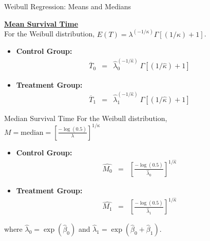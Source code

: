 \documentclass[envcountsect, 10pt, portrait, palatino]{beamer}
\begin{document}
\begin{frame}{Weibull Regression: Means and Medians}

\underline{\bf Mean Survival Time}\\[1ex]
For the Weibull distribution, $E(T)=\lambda^{(-1/\kappa)}
\Gamma[(1/\kappa) + 1]$.
\begin{itemize}
\item {\bf Control Group:}
\begin{eqnarray*}
\overline{T}_0 & = & \hat\lambda_0^{(-1/\hat\kappa)}~\Gamma[(1/\hat\kappa) + 1]
\end{eqnarray*}

\item {\bf Treatment Group:}
\begin{eqnarray*}
\overline{T}_1 & = & \hat\lambda_1^{(-1/\hat\kappa)}~\Gamma[(1/\hat\kappa) + 1]
\end{eqnarray*}
\end{itemize}

\end{frame} 
\begin{frame}{Median Survival Time}
For the Weibull distribution,
 $M = \mbox{median} = \left[\frac{-\log(0.5)}{\lambda}\right]^{1/\kappa}$
\begin{itemize}
\item {\bf Control Group:}
\begin{eqnarray*}
\hat{M_0} & = & \left[\frac{-\log(0.5)}{\hat\lambda_0}\right]^{1/\hat\kappa}
\end{eqnarray*}

\item {\bf Treatment Group:}
\begin{eqnarray*}
\hat{M_1} & = & \left[\frac{-\log(0.5)}{\hat\lambda_1}\right]^{1/\hat\kappa}
\end{eqnarray*}
\end{itemize}
where $\hat\lambda_0=\exp(\hat\beta_0)$ and
$\hat\lambda_1=\exp(\hat\beta_0+\hat\beta_1)$.
\end{frame} 
\end{document}
